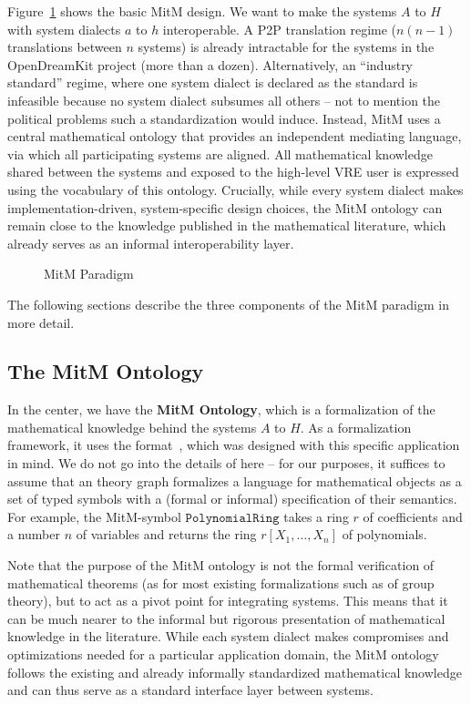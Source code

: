 
Figure~\ref{fig:mitm} shows the basic MitM design.
We want to make the systems $A$ to $H$ with system dialects $a$ to $h$ interoperable.
A P2P translation regime ($n(n-1)$ translations between $n$ systems) is already intractable for the systems in the OpenDreamKit project (more than a dozen).
Alternatively, an ``industry standard'' regime, where one system dialect is declared as the standard is infeasible because no system dialect subsumes all others -- not to mention the political problems such a standardization would induce.
Instead, MitM uses a central mathematical ontology that provides an independent mediating language, via which all participating systems are aligned.
All mathematical knowledge shared between the systems and exposed to the high-level VRE user is expressed using the vocabulary of this ontology.
Crucially, while every system dialect makes implementation-driven, system-specific design choices, the MitM ontology can remain close to the knowledge published in the mathematical literature, which already serves as an informal interoperability layer.

\begin{figure}[ht]\centering
  \caption{MitM Paradigm}\label{fig:mitm}
\end{figure}

The following sections describe the three components of the MitM paradigm in more detail.

\subsection{The MitM Ontology}\label{sec:mitm:recap}

In the center, we have the \textbf{MitM Ontology}, which is a formalization of
the mathematical knowledge behind the systems $A$ to $H$.
As a formalization framework, it uses the \OMMT format~\cite{Kohlhase:OMDoc1.2,RabKoh:WSMSML13,uniformal:on}, which was designed with this specific application in mind.
We do not go into the details of \OMMT here -- for our purposes, it
suffices to assume that an \OMMT theory graph formalizes a language for mathematical objects as a set of typed symbols with a (formal or informal) specification of their semantics.
For example, the MitM-symbol $\mathtt{PolynomialRing}$ takes a ring $r$ of coefficients and a number $n$ of variables and returns the ring $r[X_1,\ldots,X_n]$ of polynomials.

Note that the purpose of the MitM ontology is not the formal verification of mathematical
theorems (as for most existing formalizations such as \cite{Gonthier+:mcpoot13} of group
theory), but to act as a pivot point for integrating systems. This means that it can be
much nearer to the informal but rigorous presentation of mathematical knowledge in the
literature. While each system dialect makes compromises and optimizations needed for a
particular application domain, the MitM ontology follows the existing and already
informally standardized mathematical knowledge and can thus serve as a standard interface
layer between systems.

